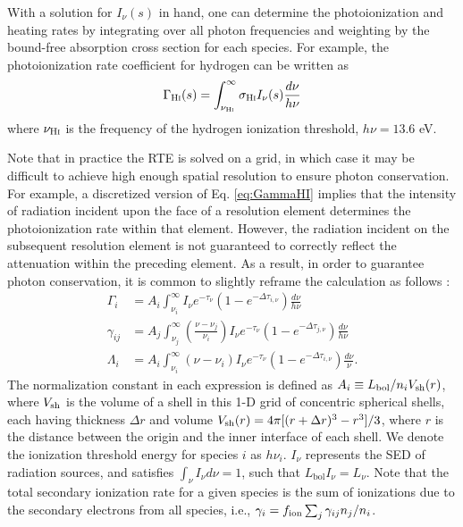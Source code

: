 With a solution for $I_{\nu}(s)$ in hand, one can determine the photoionization and heating rates by integrating over all photon frequencies and weighting by the bound-free absorption cross section for each species. For example, the photoionization rate coefficient for hydrogen can be written as 
\begin{equation}
	\Gamma_{\text{H} {\textsc{i}}}(s) = \int_{\nu_{\text{H} {\textsc{i}}}}^{\infty} \sigma_{\text{H} {\textsc{i}}} I_{\nu}(s) \frac{d\nu}{h\nu} \label{eq:GammaHI}
\end{equation}
where $\nu_{\text{H} {\textsc{i}}}$ is the frequency of the hydrogen ionization threshold, $h\nu=13.6$ eV.

Note that in practice the RTE is solved on a grid, in which case it may be difficult to achieve high enough spatial resolution to ensure photon conservation. For example, a discretized version of Eq. \ref{eq:GammaHI} implies that the intensity of radiation incident upon the face of a resolution element determines the photoionization rate within that element. However, the radiation incident on the subsequent resolution element is not guaranteed to correctly reflect the attenuation within the preceding element. As a result, in order to guarantee photon conservation, it is common to slightly reframe the calculation as follows \cite{Abel1999}:
\begin{align}
    \Gamma_i & = A_i \int_{\nu_i}^{\infty} I_{\nu} e^{-\tau_{\nu}} \left(1 - e^{-\Delta \tau_{i,\nu}}\right) \frac{d\nu}{h\nu} \label{eq:PhotoIonizationRate} \\
    \gamma_{ij} & = A_j \int_{\nu_j}^{\infty} \left(\frac{\nu - \nu_j}{\nu_i}\right) I_{\nu} e^{-\tau_{\nu}} \left(1 - e^{-\Delta \tau_{j,\nu}}\right) \frac{d\nu}{h\nu} \label{eq:SecondaryIonizationRate} \\
    \Lambda_i & = A_i \int_{\nu_i}^{\infty} (\nu - \nu_i) I_{\nu} e^{-\tau_{\nu}} \left(1 - e^{-\Delta \tau_{i,\nu}}\right) \frac{d\nu}{\nu}  \label{eq:HeatingRate} .
\end{align}
The normalization constant in each expression is defined as $A_i \equiv L_{\mathrm{bol}}/n_i V_{\mathrm{sh}}(r)$, where $V_{\mathrm{sh}}$ is the volume of a shell in this 1-D grid of concentric spherical shells, each having thickness $\Delta r$ and volume $V_{\mathrm{sh}}(r) = 4 \pi [(r + \Delta r)^3 - r^3] / 3$, where $r$ is the distance between the origin and the inner interface of each shell. We denote the ionization threshold energy for species $i$ as $h\nu_i$. $I_{\nu}$ represents the SED of radiation sources, and satisfies $\int_{\nu} I_{\nu} d\nu = 1$, such that $L_{\mathrm{bol}} I_{\nu} = L_{\nu}$. Note that the total secondary ionization rate for a given species is the sum of ionizations due to the secondary electrons from all species, i.e., $\gamma_i = f_{\text{ion}} \sum_j \gamma_{ij} n_j / n_i$.

